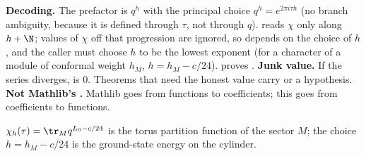 \begin{dictionary}
\textbf{Decoding.} The prefactor  is $q^h$ with the principal choice $q^h = e^{2\pi i\tau h}$ (no branch
ambiguity, because it is defined through $\tau$, not through $q$).  reads $\chi$ only along $h+\N$; values of
$\chi$ off that progression are ignored, so  depends on the choice of $h$, and the caller must choose $h$
to be the lowest exponent (for a character of a module of conformal weight $h_M$, $h = h_M - c/24$). 
proves . \textbf{Junk value.} If the series diverges,  is $0$.
Theorems that need the honest value carry  or a  hypothesis. \textbf{Not Mathlib's
.} Mathlib goes from functions to coefficients; this goes from coefficients to functions.
\end{dictionary}
\begin{physics}
$\chi_h(\tau) = \tr_Mq^{L_0-c/24}$ is the torus partition function of the sector $M$; the choice $h = h_M - c/24$ is the
ground-state energy on the cylinder.
\end{physics}

